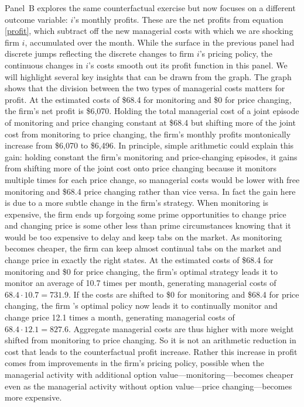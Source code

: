 \documentclass[11pt]{article}
\begin{document}
\begin{spacing}{1.3}
Panel~B explores the same counterfactual exercise but now focuses on a
different outcome variable: $i$'s monthly profits. These are the net
profits from equation \eqref{profit}, which subtract off the new
managerial costs with which we are shocking firm $i$, accumulated over
the month. While the surface in the previous panel had discrete jumps
reflecting the discrete changes to firm $i$'s pricing policy, the
continuous changes in $i$'s costs smooth out its profit function in
this panel. We will highlight several key insights that can be drawn
from the graph. The graph shows that the division between the two
types of managerial costs matters for profit. At the estimated costs
of \$68.4 for monitoring and \$0 for price changing, the firm's net
profit is \$6,070.  Holding the total managerial cost of a joint
episode of monitoring and price changing constant at \$68.4 but
shifting more of the joint cost from monitoring to price changing, the
firm's monthly profits montonically increase from \$6,070 to
\$6,496. In principle, simple arithmetic could explain this gain:
holding constant the firm's monitoring and price-changing episodes, it
gains from shifting more of the joint cost onto price changing because
it monitors multiple times for each price change, so managerial costs
would be lower with free monitoring and \$68.4 price changing rather
than vice versa. In fact the gain here is due to a more subtle change
in the firm's strategy. When monitoring is expensive, the firm ends up
forgoing some prime opportunities to change price and changing price
is some other less than prime circumstances knowing that it would be
too expensive to delay and keep tabs on the market. As monitoring
becomes cheaper, the firm can keep almost continual tabs on the market
and change price in exactly the right states. At the estimated costs
of \$68.4 for monitoring and \$0 for price changing, the firm's
optimal strategy leads it to monitor an average of 10.7 times per
month, generating managerial costs of $68.4 \cdot 10.7 = 731.9$. If
the costs are shifted to \$0 for monitoring and \$68.4 for price
changing, the firm 's optimal policy now leads it to continually
monitor and change price 12.1 times a month, generating managerial
costs of $68.4 \cdot 12.1 = 827.6$. Aggregate managerial costs are
thus higher with more weight shifted from monitoring to price
changing. So it is not an arithmetic reduction in cost that leads to
the counterfactual profit increase. Rather this increase in profit
comes from improvements in the firm's pricing policy, possible when
the managerial activity with additional option
value---monitoring---becomes cheaper even as the managerial activity
without option value---price changing---becomes more expensive.


\end{spacing}
\end{document}

